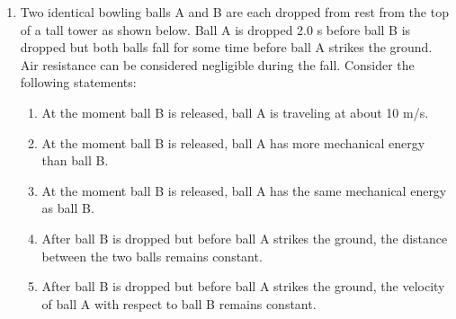 \documentclass[12pt,letterpaper]{article}
\begin{document}
\begin{enumerate}
\item
Two identical bowling balls A and B are each dropped from rest from the top of a tall tower as shown below. Ball A is dropped 2.0 s before ball B is dropped but both balls fall for some time before ball A strikes the ground. Air resistance can be considered negligible during the fall. Consider the following statements:
\begin{enumerate}[label=\Roman*.]
\item At the moment ball B is released, ball A is traveling at about 10 m/s.
\item At the moment ball B is released, ball A has more mechanical energy than ball B.
\item At the moment ball B is released, ball A has the same mechanical energy as ball B.
\item After ball B is dropped but before ball A strikes the ground, the distance between the two balls remains constant.
\item After ball B is dropped but before ball A strikes the ground, the velocity of ball A with respect to ball B remains constant.
\end{enumerate}

\begin{tabular}{l r}


\end{tabular}
\end{enumerate}
\end{document}
